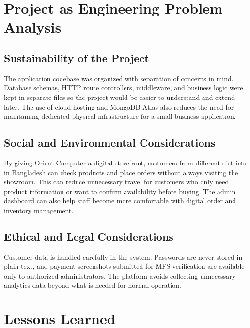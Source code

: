\documentclass[12pt,a4paper,oneside]{report}
\begin{document}
\chapter{Project as Engineering Problem Analysis}

\section{Sustainability of the Project}
The application codebase was organized with separation of concerns in mind. Database schemas, HTTP route controllers, middleware, and business logic were kept in separate files so the project would be easier to understand and extend later. The use of cloud hosting and MongoDB Atlas also reduces the need for maintaining dedicated physical infrastructure for a small business application.

\section{Social and Environmental Considerations}
By giving Orient Computer a digital storefront, customers from different districts in Bangladesh can check products and place orders without always visiting the showroom. This can reduce unnecessary travel for customers who only need product information or want to confirm availability before buying. The admin dashboard can also help staff become more comfortable with digital order and inventory management.

\section{Ethical and Legal Considerations}
Customer data is handled carefully in the system. Passwords are never stored in plain text, and payment screenshots submitted for MFS verification are available only to authorized administrators. The platform avoids collecting unnecessary analytics data beyond what is needed for normal operation.

\chapter{Lessons Learned}
\end{document}
